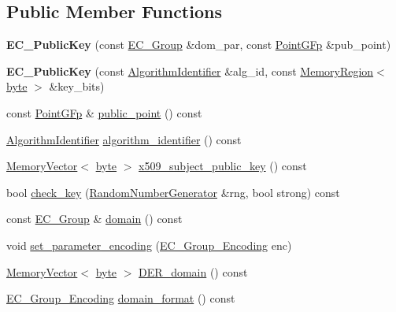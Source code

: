 \subsection*{Public Member Functions}
\begin{DoxyCompactItemize}
\item 
\hypertarget{classBotan_1_1EC__PublicKey_ae2e609a1e6e62d89051dbe70ad5da80b}{{\bfseries E\-C\-\_\-\-Public\-Key} (const \hyperlink{classBotan_1_1EC__Group}{E\-C\-\_\-\-Group} \&dom\-\_\-par, const \hyperlink{classBotan_1_1PointGFp}{Point\-G\-Fp} \&pub\-\_\-point)}\label{classBotan_1_1EC__PublicKey_ae2e609a1e6e62d89051dbe70ad5da80b}

\item 
\hypertarget{classBotan_1_1EC__PublicKey_a7b542f2b587818cfe31c342998a8db58}{{\bfseries E\-C\-\_\-\-Public\-Key} (const \hyperlink{classBotan_1_1AlgorithmIdentifier}{Algorithm\-Identifier} \&alg\-\_\-id, const \hyperlink{classBotan_1_1MemoryRegion}{Memory\-Region}$<$ \hyperlink{namespaceBotan_a7d793989d801281df48c6b19616b8b84}{byte} $>$ \&key\-\_\-bits)}\label{classBotan_1_1EC__PublicKey_a7b542f2b587818cfe31c342998a8db58}

\item 
const \hyperlink{classBotan_1_1PointGFp}{Point\-G\-Fp} \& \hyperlink{classBotan_1_1EC__PublicKey_aaa811accdc280b77c1904bbbd819a1f7}{public\-\_\-point} () const 
\item 
\hyperlink{classBotan_1_1AlgorithmIdentifier}{Algorithm\-Identifier} \hyperlink{classBotan_1_1EC__PublicKey_a6e056251be1915676f4e50f33d37b735}{algorithm\-\_\-identifier} () const 
\item 
\hyperlink{classBotan_1_1MemoryVector}{Memory\-Vector}$<$ \hyperlink{namespaceBotan_a7d793989d801281df48c6b19616b8b84}{byte} $>$ \hyperlink{classBotan_1_1EC__PublicKey_ab276d6e5d43c11c12baa3759b532693f}{x509\-\_\-subject\-\_\-public\-\_\-key} () const 
\item 
bool \hyperlink{classBotan_1_1EC__PublicKey_a3a0b99859fb776f0a7fe51bfed04dfed}{check\-\_\-key} (\hyperlink{classBotan_1_1RandomNumberGenerator}{Random\-Number\-Generator} \&rng, bool strong) const 
\item 
const \hyperlink{classBotan_1_1EC__Group}{E\-C\-\_\-\-Group} \& \hyperlink{classBotan_1_1EC__PublicKey_a5fe61411ec55d30d9cf0c36116223a71}{domain} () const 
\item 
void \hyperlink{classBotan_1_1EC__PublicKey_a2b9d4da46df401c396278b7643bdbc51}{set\-\_\-parameter\-\_\-encoding} (\hyperlink{namespaceBotan_ad0ee6307c8f311388a2bc00426a7f858}{E\-C\-\_\-\-Group\-\_\-\-Encoding} enc)
\item 
\hyperlink{classBotan_1_1MemoryVector}{Memory\-Vector}$<$ \hyperlink{namespaceBotan_a7d793989d801281df48c6b19616b8b84}{byte} $>$ \hyperlink{classBotan_1_1EC__PublicKey_a62dc87f0317c544394bd839d7ff63fcb}{D\-E\-R\-\_\-domain} () const 
\item 
\hyperlink{namespaceBotan_ad0ee6307c8f311388a2bc00426a7f858}{E\-C\-\_\-\-Group\-\_\-\-Encoding} \hyperlink{classBotan_1_1EC__PublicKey_aeb47f65771b1d8b3e7e1468dfad7a67c}{domain\-\_\-format} () const 
\end{DoxyCompactItemize}
